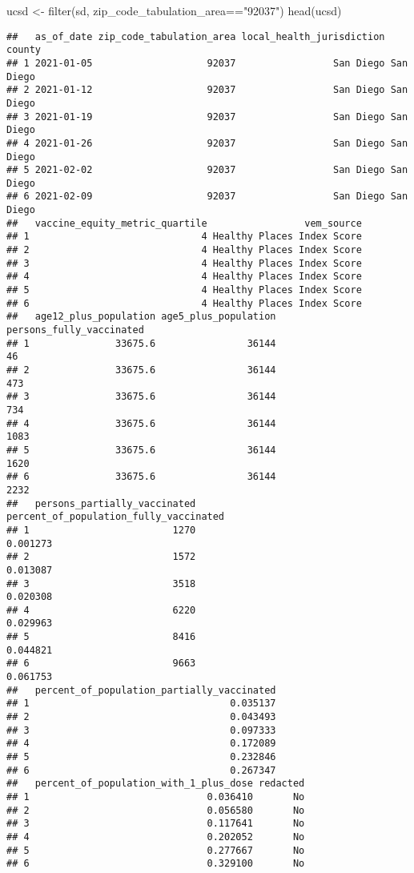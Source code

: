 \documentclass[
]{article}
\newenvironment{Shaded}{\begin{snugshade}}{\end{snugshade}}
\newcommand{\FunctionTok}[1]{\textcolor[rgb]{0.00,0.00,0.00}{#1}}
\newcommand{\NormalTok}[1]{#1}
\newcommand{\OtherTok}[1]{\textcolor[rgb]{0.56,0.35,0.01}{#1}}
\newcommand{\SpecialCharTok}[1]{\textcolor[rgb]{0.00,0.00,0.00}{#1}}
\newcommand{\StringTok}[1]{\textcolor[rgb]{0.31,0.60,0.02}{#1}}
\begin{document}
\begin{Shaded}
\begin{Highlighting}[]
\NormalTok{ucsd }\OtherTok{\textless{}{-}} \FunctionTok{filter}\NormalTok{(sd, zip\_code\_tabulation\_area}\SpecialCharTok{==}\StringTok{"92037"}\NormalTok{)}
\FunctionTok{head}\NormalTok{(ucsd)}
\end{Highlighting}
\end{Shaded}

\begin{verbatim}
##   as_of_date zip_code_tabulation_area local_health_jurisdiction    county
## 1 2021-01-05                    92037                 San Diego San Diego
## 2 2021-01-12                    92037                 San Diego San Diego
## 3 2021-01-19                    92037                 San Diego San Diego
## 4 2021-01-26                    92037                 San Diego San Diego
## 5 2021-02-02                    92037                 San Diego San Diego
## 6 2021-02-09                    92037                 San Diego San Diego
##   vaccine_equity_metric_quartile                 vem_source
## 1                              4 Healthy Places Index Score
## 2                              4 Healthy Places Index Score
## 3                              4 Healthy Places Index Score
## 4                              4 Healthy Places Index Score
## 5                              4 Healthy Places Index Score
## 6                              4 Healthy Places Index Score
##   age12_plus_population age5_plus_population persons_fully_vaccinated
## 1               33675.6                36144                       46
## 2               33675.6                36144                      473
## 3               33675.6                36144                      734
## 4               33675.6                36144                     1083
## 5               33675.6                36144                     1620
## 6               33675.6                36144                     2232
##   persons_partially_vaccinated percent_of_population_fully_vaccinated
## 1                         1270                               0.001273
## 2                         1572                               0.013087
## 3                         3518                               0.020308
## 4                         6220                               0.029963
## 5                         8416                               0.044821
## 6                         9663                               0.061753
##   percent_of_population_partially_vaccinated
## 1                                   0.035137
## 2                                   0.043493
## 3                                   0.097333
## 4                                   0.172089
## 5                                   0.232846
## 6                                   0.267347
##   percent_of_population_with_1_plus_dose redacted
## 1                               0.036410       No
## 2                               0.056580       No
## 3                               0.117641       No
## 4                               0.202052       No
## 5                               0.277667       No
## 6                               0.329100       No
\end{verbatim}
\end{document}
